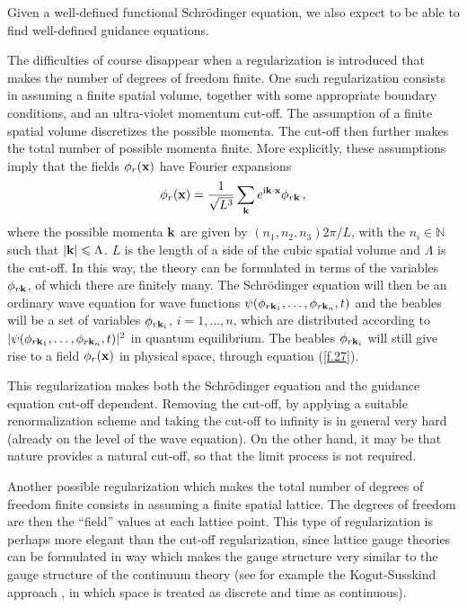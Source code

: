 \documentclass[12pt]{article}
\def\ii{\textrm i}
\begin{document}
Given a well-defined functional Schr\"odinger equation, we also expect to be able to find well-defined guidance equations.

The difficulties of course disappear when a regularization is introduced that makes the number of degrees of freedom finite. One such regularization consists in assuming a finite spatial volume, together with some appropriate boundary conditions, and an ultra-violet momentum cut-off. The assumption of a finite spatial volume discretizes the possible momenta. The cut-off then further makes the total number of possible momenta finite. More explicitly, these assumptions imply that the fields $\phi_r({\bf x})$ have Fourier expansions
\begin{equation}
\phi_r({\bf x}) = \frac{1}{\sqrt{L^3}} \sum_{ {\bf k} } e^{\ii {\bf k} \cdot {\bf x}} \phi_{r{\bf k}} \,,
\label{f.27}
\end{equation}
where the possible momenta ${\bf k}$ are given by $(n_1,n_2,n_3)2\pi/L$, with the $n_i \in {\mathbb N}$ such that $|{\bf k}|\leqslant \Lambda$. $L$ is the length of a side of the cubic spatial volume and $\Lambda$ is the cut-off. In this way, the theory can be formulated in terms of the variables $\phi_{r{\bf k}}$, of which there are finitely many. The Schr{\"o}\-ding\-er equation will then be an ordinary wave equation for wave functions $\psi(\phi_{r{\bf k}_1},\dots,\phi_{r{\bf k}_n},t)$ and the beables will be a set of variables $\phi_{r{\bf k}_i}$, $i=1,\dots,n$, which are distributed according to $|\psi(\phi_{r{\bf k}_1},\dots,\phi_{r{\bf k}_n},t)|^2$ in quantum equilibrium. The beables $\phi_{r{\bf k}_i}$ will still give rise to a field $\phi_r({\bf x})$ in physical space, through equation (\ref{f.27}). 

This regularization makes both the Schr{\"o}\-ding\-er equation and the guidance equation cut-off dependent. Removing the cut-off, by applying a suitable renormalization scheme and taking the cut-off to infinity is in general very hard (already on the level of the wave equation). On the other hand, it may be that nature provides a natural cut-off, so that the limit process is not required. 

Another possible regularization which makes the total number of degrees of freedom finite consists in assuming a finite spatial lattice. The degrees of freedom are then the ``field'' values at each lattice point. This type of regularization is perhaps more elegant than the cut-off regularization, since lattice gauge theories can be formulated in way which makes the gauge structure very similar to the gauge structure of the continuum theory (see for example the Kogut-Susskind approach \cite{kogut75,kogut79}, in which space is treated as discrete and time as continuous). 
\end{document}
